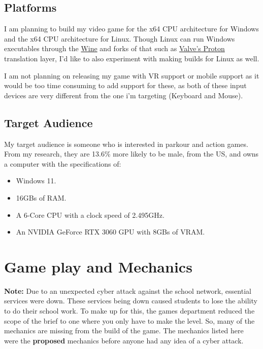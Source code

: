 \documentclass[12pt]{article}
\begin{document}
	\subsection{Platforms}
	I am planning to build my video game for the x64 CPU architecture for Windows and the x64 CPU architecture for Linux. Though Linux can run Windows executables through the \href{https://www.winehq.org}{Wine} and forks of that such as \href{https://github.com/ValveSoftware/Proton}{Valve's Proton} translation layer, I'd like to also experiment with making builds for Linux as well.
	
	I am not planning on releasing my game with VR support or mobile support as it would be too time consuming to add support for these, as both of these input devices are very different from the one i'm targeting (Keyboard and Mouse).
	
	\newpage
	\subsection{Target Audience}
	My target audience is someone who is interested in parkour and action games. From my research, they are 13.6\% more likely to be male, \cite{gameTreeIndustryReports} from the US, \cite{gameDiscoverCoCountryBreakdown} and owns a computer with the specifications of:
	\begin{itemize}
		\item Windows 11.
		\item 16GBs of RAM.
		\item A 6-Core CPU with a clock speed of 2.495GHz.
		\item An NVIDIA GeForce RTX 3060 GPU with 8GBs of VRAM.
	\end{itemize} \cite{steamHardwareSurvey}
	
	\section{Game play and Mechanics}
	\begin{note}
		\textbf{Note:} Due to an unexpected cyber attack against the school network, essential services were down. These services being down caused students to lose the ability to do their school work. To make up for this, the games department reduced the scope of the brief to one where you only have to make the level. So, many of the mechanics are missing from the build of the game. The mechanics listed here were the \textbf{proposed} mechanics before anyone had any idea of a cyber attack.
	\end{note}
\end{document}
